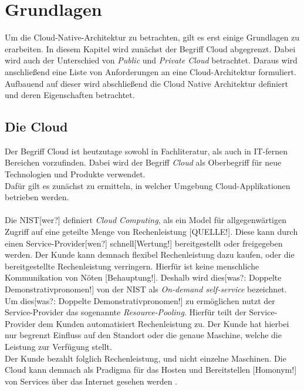 \chapter{Grundlagen}
\label{ch:grundlagen}
Um die Cloud-Native-Architektur zu betrachten, gilt es erst einige Grundlagen zu erarbeiten. In diesem Kapitel wird zunächst der Begriff Cloud abgegrenzt. Dabei wird auch der Unterschied von \textit{Public} und \textit{Private Cloud} betrachtet. Daraus wird anschließend eine Liste von Anforderungen an eine Cloud-Architektur formuliert. Aufbauend auf dieser wird abschließend die Cloud Native Architektur definiert und deren Eigenschaften betrachtet. 

\section{Die Cloud}
Der Begriff Cloud ist heutzutage sowohl in Fachliteratur, als auch in IT-fernen Bereichen vorzufinden. Dabei wird der Begriff \textit{Cloud} als Oberbegriff für neue Technologien und Produkte verwendet.\\ 
Dafür gilt es zunächst zu ermitteln, in welcher Umgebung Cloud-Applikationen betrieben werden.\\\\
Die NIST[wer?] definiert \textit{Cloud Computing}, als ein Model für allgegenwärtigen Zugriff auf eine geteilte Menge von Rechenleistung [QUELLE!]. Diese kann durch einen Service-Provider[wen?] schnell[Wertung!] bereitgestellt oder freigegeben werden. Der Kunde kann demnach flexibel Rechenleistung dazu kaufen, oder die bereitgestellte Rechenleistung verringern. Hierfür ist keine menschliche Kommunikation von Nöten [Behauptung!]. Deshalb wird dies[was?: Doppelte Demonstrativpronomen!] von der NIST als \textit{On-demand self-service} bezeichnet.\\
Um dies[was?: Doppelte Demonstrativpronomen!] zu ermöglichen nutzt der Service-Provider das sogenannte \textit{Resource-Pooling}. Hierfür teilt der Service-Provider dem Kunden automatisiert Rechenleistung zu. Der Kunde hat hierbei nur begrenzt Einfluss auf den Standort oder die genaue Maschine, welche die Leistung zur Verfügung stellt.\cite{mell_nist_2011}\\
Der Kunde bezahlt folglich Rechenleistung, und nicht einzelne Maschinen. Die Cloud kann demnach als Pradigma für das Hosten und Bereitstellen [Homonym!] von Services über das Internet gesehen werden \cite{avram_advantages_2014}.

